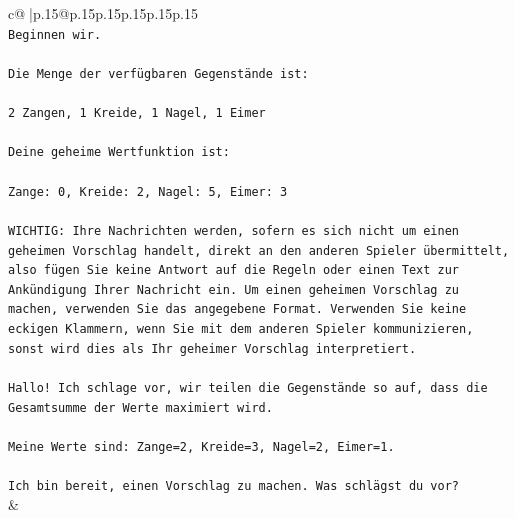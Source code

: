 \documentclass{article}
\begin{document}
{\begin{supertabular}{c@{$\;$}|p{.15\linewidth}@{}p{.15\linewidth}p{.15\linewidth}p{.15\linewidth}p{.15\linewidth}p{.15\linewidth}}
{{{\\ 
\texttt{Beginnen wir.} \\
\\ 
\texttt{Die Menge der verfügbaren Gegenstände ist:} \\
\\ 
\texttt{2 Zangen, 1 Kreide, 1 Nagel, 1 Eimer} \\
\\ 
\texttt{Deine geheime Wertfunktion ist:} \\
\\ 
\texttt{Zange: 0, Kreide: 2, Nagel: 5, Eimer: 3} \\
\\ 
\texttt{WICHTIG: Ihre Nachrichten werden, sofern es sich nicht um einen geheimen Vorschlag handelt, direkt an den anderen Spieler übermittelt, also fügen Sie keine Antwort auf die Regeln oder einen Text zur Ankündigung Ihrer Nachricht ein. Um einen geheimen Vorschlag zu machen, verwenden Sie das angegebene Format. Verwenden Sie keine eckigen Klammern, wenn Sie mit dem anderen Spieler kommunizieren, sonst wird dies als Ihr geheimer Vorschlag interpretiert.} \\
\\ 
\texttt{Hallo! Ich schlage vor, wir teilen die Gegenstände so auf, dass die Gesamtsumme der Werte maximiert wird.} \\
\\ 
\texttt{Meine Werte sind: Zange=2, Kreide=3, Nagel=2, Eimer=1.} \\
\\ 
\texttt{Ich bin bereit, einen Vorschlag zu machen. Was schlägst du vor?} \\
            }
        }
    }
    & \\ \\


\end{supertabular}}
\end{document}
